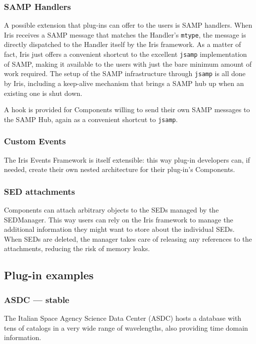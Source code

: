 \documentclass[preprint,authoryear,5p]{elsarticle}
\begin{document}
\subsubsection{SAMP Handlers} A possible extension that plug-ins can offer to
the users is SAMP handlers. When Iris receives a SAMP message that matches the
Handler's \verb|mtype|, the message is directly dispatched to the Handler itself
by the Iris framework. As a matter of fact, Iris just offers a convenient
shortcut to the excellent \verb|jsamp| implementation of SAMP, making it
available to the users with just the bare minimum amount of work required. The
setup of the SAMP infrastructure through \verb|jsamp| is all done by Iris,
including a keep-alive mechanism that brings a SAMP hub up when an existing one is
shut down.

A hook is provided for Components willing to send their own SAMP messages to the
SAMP Hub, again as a convenient shortcut to \verb|jsamp|.

\subsubsection{Custom Events} The Iris Events Framework is itself extensible:
this way plug-in developers can, if needed, create their own nested
architecture for their plug-in's Components.

\subsubsection{SED attachments} Components can attach arbitrary objects to the
SEDs managed by the SEDManager. This way users can rely on the Iris framework to
manage the additional information they might want to store about the individual
SEDs. When SEDs are deleted, the manager takes care of releasing any references
to the attachments, reducing the risk of memory leaks.



\subsection{Plug-in examples} \subsubsection{ASDC --- stable} The Italian Space
Agency Science Data Center (ASDC) hosts a database with tens of catalogs in a
very wide range of wavelengths, also providing time domain information.
\end{document}
